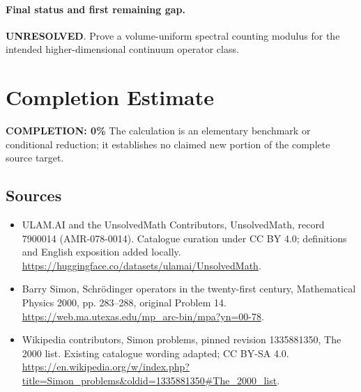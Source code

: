 \documentclass[11pt]{article}
\begin{document}
\paragraph{Final status and first remaining gap.}
\textbf{UNRESOLVED}. Prove a volume-uniform spectral counting modulus for the intended higher-dimensional continuum operator class.

\section{Completion Estimate}
\noindent\textbf{COMPLETION: 0\%}
The calculation is an elementary benchmark or conditional reduction; it establishes no claimed new portion of the complete source target.

\subsection{Sources}
\begin{itemize}
\item[\hypertarget{source:7900014:1}{S1}] ULAM.AI and the UnsolvedMath Contributors, UnsolvedMath, record 7900014 (AMR-078-0014). Catalogue curation under CC BY 4.0; definitions and English exposition added locally.
\url{https://huggingface.co/datasets/ulamai/UnsolvedMath}.
\item[\hypertarget{source:7900014:2}{S2}] Barry Simon, Schrödinger operators in the twenty-first century, Mathematical Physics 2000, pp. 283–288, original Problem 14.
\url{https://web.ma.utexas.edu/mp_arc-bin/mpa?yn=00-78}.
\item[\hypertarget{source:7900014:3}{S3}] Wikipedia contributors, Simon problems, pinned revision 1335881350, The 2000 list. Existing catalogue wording adapted; CC BY-SA 4.0.
\url{https://en.wikipedia.org/w/index.php?title=Simon_problems&oldid=1335881350#The_2000_list}.
\end{itemize}
\label{end:7900014}
\end{document}
